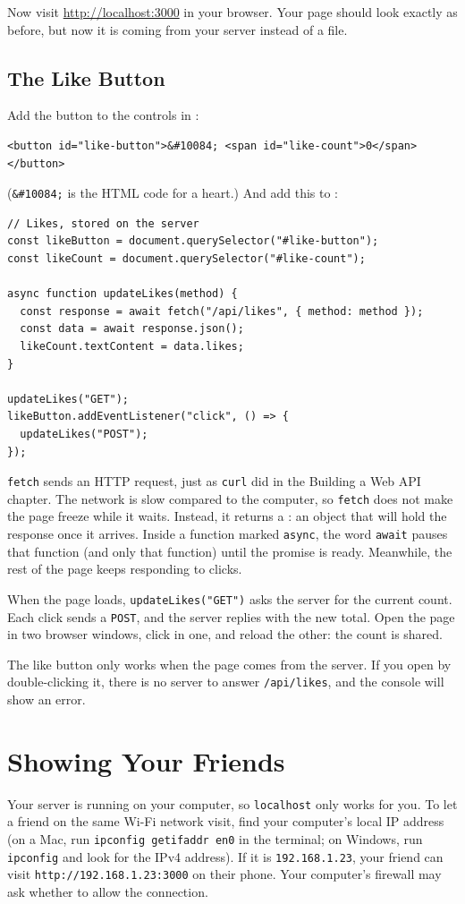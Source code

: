 Now visit \url{http://localhost:3000} in your browser. Your page should look exactly as before, but now
it is coming from your server instead of a file.

\subsection{The Like Button}
Add the button to the controls in :

\begin{verbatim}
<button id="like-button">&#10084; <span id="like-count">0</span></button>
\end{verbatim}

(\verb|&#10084;| is the HTML code for a heart.) And add this to :

\begin{verbatim}
// Likes, stored on the server
const likeButton = document.querySelector("#like-button");
const likeCount = document.querySelector("#like-count");

async function updateLikes(method) {
  const response = await fetch("/api/likes", { method: method });
  const data = await response.json();
  likeCount.textContent = data.likes;
}

updateLikes("GET");
likeButton.addEventListener("click", () => {
  updateLikes("POST");
});
\end{verbatim}

\verb|fetch| sends an HTTP request, just as \verb|curl| did in the Building a Web API chapter. The network is slow
compared to the computer, so \verb|fetch| does not make the page freeze while it waits. Instead, it
returns a : an object that will hold the response once it arrives. Inside a function
marked \verb|async|, the word \verb|await| pauses that function (and only that function) until the promise
is ready. Meanwhile, the rest of the page keeps responding to clicks.

When the page loads, \verb|updateLikes("GET")| asks the server for the current count. Each click sends a
\verb|POST|, and the server replies with the new total. Open the page in two browser windows, click in one,
and reload the other: the count is shared.

The like button only works when the page comes from the server. If you open  by
double-clicking it, there is no server to answer \verb|/api/likes|, and the console will show an error.

\section{Showing Your Friends}
Your server is running on your computer, so \verb|localhost| only works for you. To let a friend on the
same Wi-Fi network visit, find your computer's local IP address (on a Mac, run
\verb|ipconfig getifaddr en0| in the terminal; on Windows, run \verb|ipconfig| and look for the IPv4
address). If it is \verb|192.168.1.23|, your friend can visit \verb|http://192.168.1.23:3000| on their
phone. Your computer's firewall may ask whether to allow the connection.

